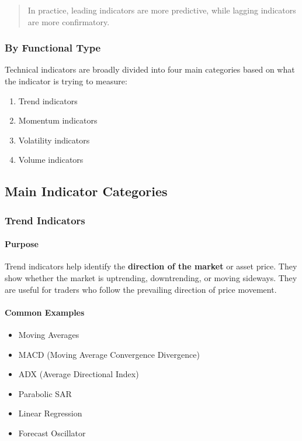 \documentclass[12pt,openany]{book}
\begin{document}
\begin{quote}
In practice, leading indicators are more predictive, while lagging indicators are more confirmatory.
\end{quote}

\subsubsection{By Functional Type}
Technical indicators are broadly divided into four main categories based on what the indicator is trying to measure:

\begin{enumerate}[leftmargin=*]
    \item Trend indicators
    \item Momentum indicators
    \item Volatility indicators
    \item Volume indicators
\end{enumerate}

\subsection{Main Indicator Categories}

\subsubsection{Trend Indicators}

\paragraph{Purpose}
Trend indicators help identify the \textbf{direction of the market} or asset price. They show whether the market is uptrending, downtrending, or moving sideways. They are useful for traders who follow the prevailing direction of price movement.

\paragraph{Common Examples}
\begin{itemize}[leftmargin=*]
    \item Moving Averages
    \item MACD (Moving Average Convergence Divergence)
    \item ADX (Average Directional Index)
    \item Parabolic SAR
    \item Linear Regression
    \item Forecast Oscillator
\end{itemize}
\end{document}
